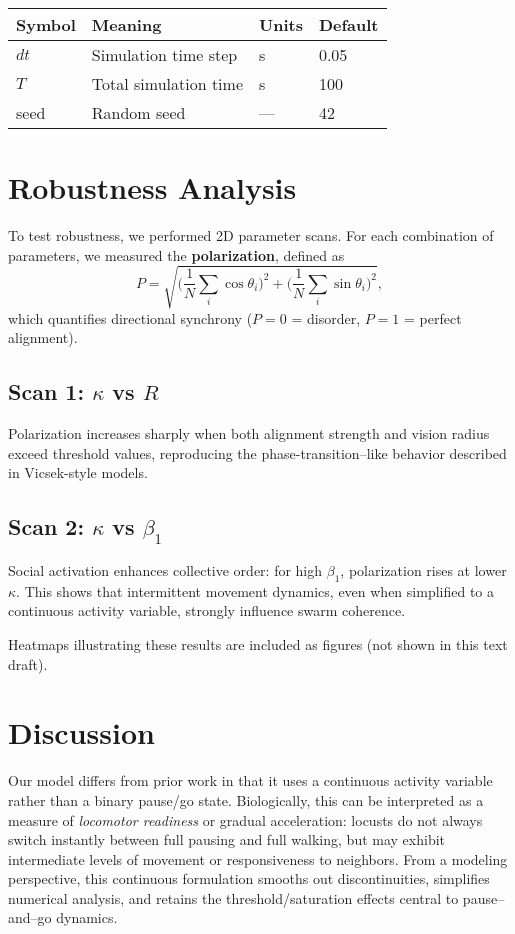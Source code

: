 \documentclass[11pt,a4paper]{article}
\begin{document}
\begin{tabular}{@{}llll@{}}
\toprule
Symbol & Meaning & Units & Default \\
\midrule
$dt$ & Simulation time step & s & 0.05 \\
$T$ & Total simulation time & s & 100 \\
seed & Random seed & --- & 42 \\
\bottomrule
\end{tabular}

\section{Robustness Analysis}

To test robustness, we performed 2D parameter scans. For each combination of parameters, we measured the \textbf{polarization}, defined as
\[
P = \sqrt{\Big(\frac{1}{N}\sum_i \cos \theta_i\Big)^2 + \Big(\frac{1}{N}\sum_i \sin \theta_i\Big)^2},
\]
which quantifies directional synchrony ($P=0$ = disorder, $P=1$ = perfect alignment).

\subsection{Scan 1: $\kappa$ vs $R$}
Polarization increases sharply when both alignment strength and vision radius exceed threshold values, reproducing the phase-transition–like behavior described in Vicsek-style models.

\subsection{Scan 2: $\kappa$ vs $\beta_1$}
Social activation enhances collective order: for high $\beta_1$, polarization rises at lower $\kappa$. This shows that intermittent movement dynamics, even when simplified to a continuous activity variable, strongly influence swarm coherence.

Heatmaps illustrating these results are included as figures (not shown in this text draft).

\section{Discussion}

Our model differs from prior work in that it uses a continuous activity variable rather than a binary pause/go state. Biologically, this can be interpreted as a measure of \emph{locomotor readiness} or gradual acceleration: locusts do not always switch instantly between full pausing and full walking, but may exhibit intermediate levels of movement or responsiveness to neighbors. From a modeling perspective, this continuous formulation smooths out discontinuities, simplifies numerical analysis, and retains the threshold/saturation effects central to pause–and–go dynamics.  
\end{document}
